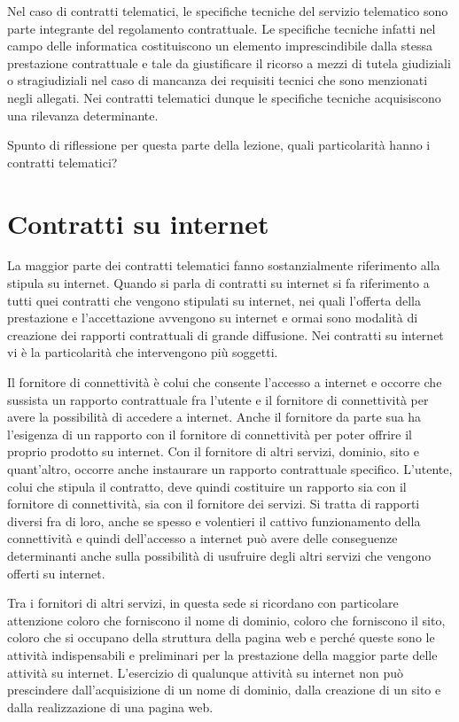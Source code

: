 Nel caso di contratti telematici, le specifiche tecniche del servizio telematico sono parte integrante del regolamento contrattuale. Le specifiche tecniche infatti nel campo delle informatica costituiscono un elemento imprescindibile dalla stessa prestazione contrattuale e tale da giustificare il ricorso a mezzi di tutela giudiziali o stragiudiziali nel caso di mancanza dei requisiti tecnici che sono menzionati negli allegati. Nei contratti telematici dunque le specifiche tecniche acquisiscono una rilevanza determinante. 

Spunto di riflessione per questa parte della lezione, quali particolarità hanno i contratti telematici? 

\section{Contratti su internet}
La maggior parte dei contratti telematici fanno sostanzialmente riferimento alla stipula su internet. Quando si parla di contratti su internet si fa riferimento a tutti quei contratti che vengono stipulati su internet, nei quali l'offerta della prestazione e l'accettazione avvengono su internet e ormai sono modalità di creazione dei rapporti contrattuali di grande diffusione. 
Nei contratti su internet vi è la particolarità che intervengono più soggetti. 

Il fornitore di connettività è colui che consente l'accesso a internet e occorre che sussista un rapporto contrattuale fra l'utente e il fornitore di connettività per avere la possibilità di accedere a internet. Anche il fornitore da parte sua ha l'esigenza di un rapporto con il fornitore di connettività per poter offrire il proprio prodotto su internet. Con il fornitore di altri servizi, dominio, sito e quant'altro, occorre anche instaurare un rapporto contrattuale specifico. L'utente, colui che stipula il contratto, deve quindi costituire un rapporto sia con il fornitore di connettività, sia con il fornitore dei servizi. Si tratta di rapporti diversi fra di loro, anche se spesso e volentieri il cattivo funzionamento della connettività e quindi dell'accesso a internet può avere delle conseguenze determinanti anche sulla possibilità di usufruire degli altri servizi che vengono offerti su internet. 

Tra i fornitori di altri servizi, in questa sede si ricordano con particolare attenzione coloro che forniscono il nome di dominio, coloro che forniscono il sito, coloro che si occupano della struttura della pagina web e perché queste sono le attività indispensabili e preliminari per la prestazione della maggior parte delle attività su internet. L'esercizio di qualunque attività su internet non può prescindere dall'acquisizione di un nome di dominio, dalla creazione di un sito e dalla realizzazione di una pagina web. 

